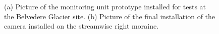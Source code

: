 \begin{figure}[ht!]
  \centering
   \quad
  \caption{(a) Picture of the monitoring unit prototype installed for tests at the Belvedere Glacier site. (b) Picture of the final installation of the camera installed on the streamwise right moraine.}
  \label{fig:4:final_installation}
\end{figure}


